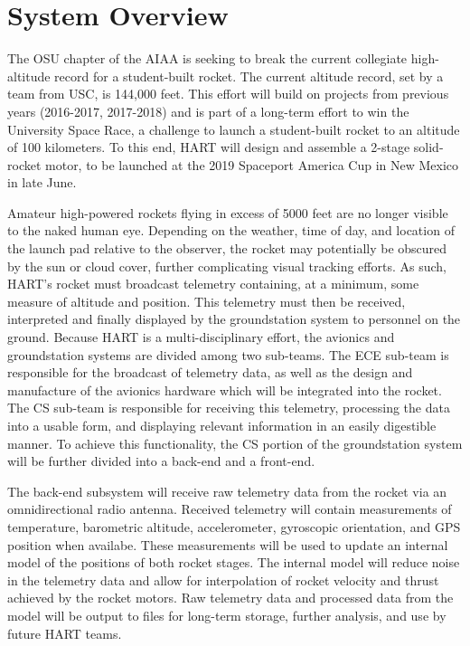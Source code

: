 \documentclass[onecolumn, draftclsnofoot,10pt, compsoc]{IEEEtran}
\begin{document}
\section{System Overview}
The OSU chapter of the AIAA is seeking to break the current collegiate high-altitude record for a student-built rocket.
The current altitude record, set by a team from USC, is 144,000 feet.
This effort will build on projects from previous years (2016-2017, 2017-2018) and is part of a long-term effort to win the University Space Race, a challenge to launch a student-built rocket to an altitude of 100 kilometers.
To this end, HART will design and assemble a 2-stage solid-rocket motor, to be launched at the 2019 Spaceport America Cup in New Mexico in late June. 

Amateur high-powered rockets flying in excess of 5000 feet are no longer visible to the naked human eye. 
Depending on the weather, time of day, and location of the launch pad relative to the observer, the rocket may potentially be obscured by the sun or cloud cover, further complicating visual tracking efforts. 
As such, HART's rocket must broadcast telemetry containing, at a minimum, some measure of altitude and position.
This telemetry must then be received, interpreted and finally displayed by the groundstation system to personnel on the ground.
Because HART is a multi-disciplinary effort, the avionics and groundstation systems are divided among two sub-teams.
The ECE sub-team is responsible for the broadcast of telemetry data, as well as the design and manufacture of the avionics hardware which will be integrated into the rocket.
The CS sub-team is responsible for receiving this telemetry, processing the data into a usable form, and displaying relevant information in an easily digestible manner.
To achieve this functionality, the CS portion of the groundstation system will be further divided into a back-end and a front-end.

The back-end subsystem will receive raw telemetry data from the rocket via an omnidirectional radio antenna.
Received telemetry will contain measurements of temperature, barometric altitude, accelerometer, gyroscopic orientation, and GPS position when availabe.
These measurements will be used to update an internal model of the positions of both rocket stages.
The internal model will reduce noise in the telemetry data and allow for interpolation of rocket velocity and thrust achieved by the rocket motors.
Raw telemetry data and processed data from the model will be output to files for long-term storage, further analysis, and use by future HART teams.
\end{document}
